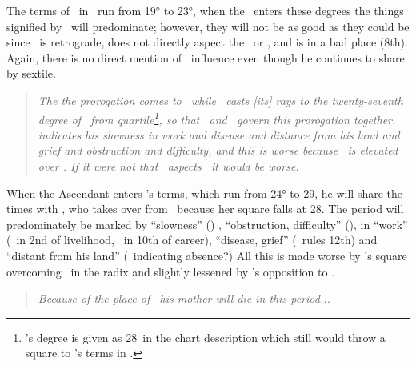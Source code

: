 The terms of \Jupiter\, in \Scorpio\, run from 19° to 23°, when the \ASC\, enters these degrees the things signified by \Jupiter\, will predominate; however, they will not be as good as they could be since \Jupiter\, is retrograde, does not directly aspect the \Moon\, or \ASC, and is in a bad place (8th). Again, there is no direct mention of \Mars\, influence even though he continues to share by sextile.

\begin{quote}
\textsl{The the prorogation comes to \Saturn\, while \Venus\, casts [its] rays to the twenty-seventh degree of \Scorpio\, from quartile\footnote{\Venus's degree is given as 28\Leo\, in the chart description which still would throw a square to \Saturn's terms in \Scorpio.}, so that \Saturn\, and \Venus\, govern this prorogation together. \Saturn\, indicates his slowness in work and disease and distance from his land and grief and obstruction and difficulty, and this is worse because \Mars\, is elevated over \Saturn. If it were not that \Jupiter\, aspects \Saturn\, it would be worse.}
\end{quote}

When the Ascendant enters \Saturn's terms, which run from 24° to 29\Scorpio,  he will share the times with \Venus, who takes over from \Mars\, because her square falls at 28\Scorpio. The period will predominately be marked by ``slowness'' (\Saturn) , ``obstruction, difficulty'' (\Square), in ``work'' (\Saturn\, in 2nd of livelihood, \Venus\, in 10th of career), ``disease, grief'' (\Venus\, rules 12th) and ``distant from his land'' (\Saturn\, indicating absence?) All this is made worse by \Mars's square overcoming \Saturn\, in the radix and slightly lessened by \Jupiter's opposition to \Saturn.

\begin{quote}
\textsl{Because of the place of \Saturn\, his mother will die in this period...}
\end{quote}

